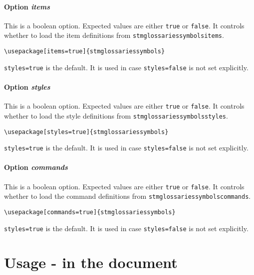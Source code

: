\documentclass[%
  type=article,%
  layout=koma,%
  hyperref=true,%
  conditionallox=true,%
  conditionalloxnewpage=false,%
  date=true,%
  index=true,%
  listings=true%
]{stmtext}
\begin{document}
\paragraph{Option \protect\textit{items}}

This is a boolean option. Expected values are either \texttt{true} or \texttt{false}. It controls whether to load the item definitions from \texttt{stmglossariessymbolsitems}.

\begin{verbatim}
\usepackage[items=true]{stmglossariessymbols}
\end{verbatim}

\texttt{styles=true} is the default. It is used in case \texttt{styles=false} is not set explicitly.

\paragraph{Option \protect\textit{styles}}

This is a boolean option. Expected values are either \texttt{true} or \texttt{false}. It controls whether to load the style definitions from \texttt{stmglossariessymbolsstyles}.

\begin{verbatim}
\usepackage[styles=true]{stmglossariessymbols}
\end{verbatim}

\texttt{styles=true} is the default. It is used in case \texttt{styles=false} is not set explicitly.

\paragraph{Option \protect\textit{commands}}

This is a boolean option. Expected values are either \texttt{true} or \texttt{false}. It controls whether to load the command definitions from \texttt{stmglossariessymbolscommands}.

\begin{verbatim}
\usepackage[commands=true]{stmglossariessymbols}
\end{verbatim}

\texttt{styles=true} is the default. It is used in case \texttt{styles=false} is not set explicitly.

\section{Usage - in the document}
\label{sec:usage:document}
\end{document}
